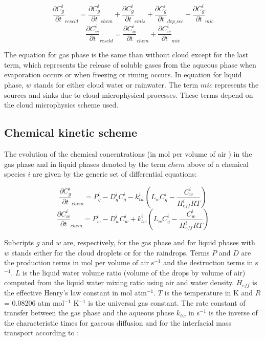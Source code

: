 \begin{equation}
\frac{\partial C_{g}^{i}}{\partial t}_{rescld}=\frac{\partial C_{g}^{i}}{\partial t}_{chem}+\frac{\partial C_{g}^{i}}{\partial t}_{emis}+\frac{\partial C_{g}^{i}}{\partial t}_{dep\_sec}+\frac{\partial C_{g}^{i}}{\partial t}_{mic}
\end{equation}
\begin{equation}
\frac{\partial C_{w}^{i}}{\partial t}_{rescld}=\frac{\partial C_{w}^{i}}{\partial t}_{chem}+\frac{\partial C_{w}^{i}}{\partial t}_{mic}
\end{equation}

The equation for gas phase is the same than without cloud except for the last term, which represents the release of soluble gases from the aqueous phase when evaporation occurs or when freezing or riming occurs. 
In equation for liquid phase, $w$ stands for either cloud water or rainwater. The term $mic$ represents the sources and sinks due to cloud microphysical processes. These terms depend on the cloud microphysics scheme used.

 \subsection{Chemical kinetic scheme}
The evolution of the chemical concentrations (in mol per volume of air ) in the gas phase and in liquid phases denoted by the term $chem$ above of a chemical species $i$ are given by the generic set of differential equations:

\begin{equation}
  \frac{\partial C_{g}^{i}}{\partial t}_{chem}=P_{g}^{i}-D_{g}^{i}C_{g}^{i}-k_{tw}^{i}\left (   L_{w}C_{g}^{i}-\frac{C_{w}^{i}}{H_{eff}^{i}RT} \right )
  \label{toto1}
\end{equation}
\begin{equation}
  \frac{\partial C_{w}^{i}}{\partial t}_{chem}=P_{w}^{i}-D_{w}^{i}C_{w}^{i}+k_{tw}^{i}\left ( L_{w}C_{g}^{i}-\frac{C_{w}^{i}}{H_{eff}^{i}RT} \right )
  \label{toto2}
\end{equation}

Subcripts $g$ and $w$ are, respectively, for the gas phase and for liquid phases with $w$ stands either for the cloud droplets or for the raindrops. Terms $P$ and $D$ are the production terms in mol per volume of air s$^{-1}$ and the destruction terms in s$^{-1}$. $L$ is the liquid water volume ratio (volume of the drops by volume of air) computed from the liquid water mixing ratio using air and water density. $H_{eff}$ is the effective Henry's law constant in mol atm$^{-1}$. $T$ is the temperature in K and $R$ = 0.08206 atm mol$^{-1}$ K$^{-1}$ is the universal gas constant. The rate constant of transfer between the gas phase and the aqueous phase $k_{tw}$ in s$^{-1}$ is the inverse of the characteristic times for gaseous diffusion and for the interfacial mass transport according to \citet{Schwartz1986}:

